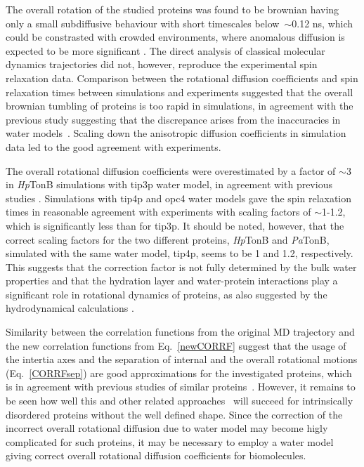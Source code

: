 \documentclass[pre,aps,floatfix,authordate1-4,twocolumn]{revtex4-1}
\begin{document}
The overall rotation of the studied proteins was found to be brownian having
only a small subdiffusive behaviour with short timescales
below~$\sim$0.12 ns, which could be constrasted with crowded environments,
where anomalous diffusion is expected to be more significant \cite{hofling13}.
The direct analysis of classical molecular dynamics trajectories did not, however,
reproduce the experimental spin relaxation data. Comparison between the rotational 
diffusion coefficients and spin relaxation times between simulations
and experiments suggested that
the overall brownian tumbling of proteins is too rapid in simulations,
in agreement with the previous study suggesting that the discrepance arises
from the inaccuracies in water models~\cite{wong08}.
Scaling down the anisotropic diffusion coefficients in simulation data
led to the good agreement with experiments.


The overall rotational diffusion coefficients were overestimated by a factor of $\sim$3 in
{\it Hp}TonB simulations with tip3p water model, in agreement with previous
studies \cite{prompers02,wong08,anderson12}. Simulations with tip4p and opc4
water models gave the spin relaxation times in reasonable agreement with experiments
with scaling factors of $\sim$1-1.2, which is significantly less than for tip3p.
It should be noted, however, that the correct scaling factors for 
the two different proteins, {\it Hp}TonB and {\it Pa}TonB, simulated with the
same water model, tip4p, seems to be 1 and 1.2, respectively. This suggests
that the correction factor is not fully determined by the bulk water properties
and that the hydration layer and water-protein interactions play a significant
role in rotational dynamics of proteins, as also suggested by the hydrodynamical 
calculations \cite{torre00}.



Similarity between the correlation functions from the original MD trajectory and
the new correlation functions from Eq.~\ref{newCORRF} 
suggest that the usage of the intertia axes
and the separation of internal and the overall rotational motions
(Eq.~\ref{CORRFsep}) are good approximations for the investigated
proteins, which is in agreement with previous studies of similar 
proteins~\cite{wong08,allner15}. However, it remains to be seen
how well this and other related approaches~\cite{prompers02,anderson12} 
will succeed for intrinsically disordered proteins without
the well defined shape. Since the correction of the incorrect overall
rotational diffusion due to water model may become higly complicated for such proteins,
it may be necessary to employ a water model giving correct
overall rotational diffusion coefficients for biomolecules.
\end{document}
